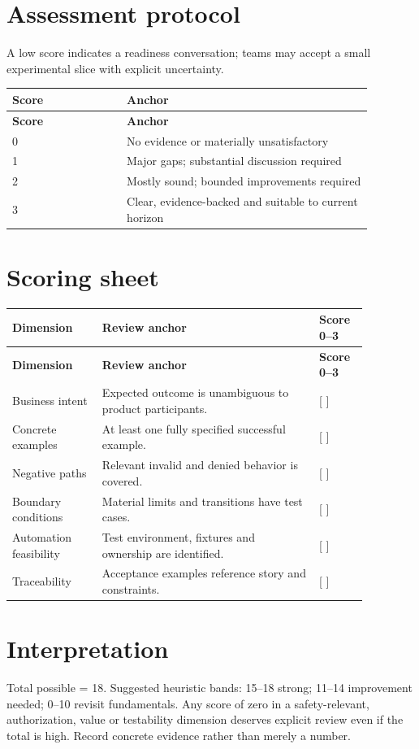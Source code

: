 \documentclass[11pt,letterpaper]{article}
\begin{document}
\section{Assessment protocol}
A low score indicates a readiness conversation; teams may accept a small experimental slice with explicit uncertainty.

\begin{longtable}{|p{0.28\linewidth}|p{0.60\linewidth}|}\hline
\textbf{Score} & \textbf{Anchor} \\ \hline\endfirsthead\hline
\textbf{Score} & \textbf{Anchor} \\ \hline\endhead
0 & No evidence or materially unsatisfactory \\ \hline
1 & Major gaps; substantial discussion required \\ \hline
2 & Mostly sound; bounded improvements required \\ \hline
3 & Clear, evidence-backed and suitable to current horizon \\ \hline
\end{longtable}
\section{Scoring sheet}
\begin{longtable}{|p{0.22\linewidth}|p{0.53\linewidth}|p{0.12\linewidth}|}\hline
\textbf{Dimension} & \textbf{Review anchor} & \textbf{Score 0--3} \\ \hline\endfirsthead
\textbf{Dimension} & \textbf{Review anchor} & \textbf{Score 0--3} \\ \hline\endhead
Business intent & Expected outcome is unambiguous to product participants. & [  ] \\ \hline
Concrete examples & At least one fully specified successful example. & [  ] \\ \hline
Negative paths & Relevant invalid and denied behavior is covered. & [  ] \\ \hline
Boundary conditions & Material limits and transitions have test cases. & [  ] \\ \hline
Automation feasibility & Test environment, fixtures and ownership are identified. & [  ] \\ \hline
Traceability & Acceptance examples reference story and constraints. & [  ] \\ \hline
\end{longtable}
\section{Interpretation}
Total possible = 18. Suggested heuristic bands: 15–18 strong; 11–14 improvement needed; 0–10 revisit fundamentals. Any score of zero in a safety-relevant, authorization, value or testability dimension deserves explicit review even if the total is high. Record concrete evidence rather than merely a number.
\end{document}

